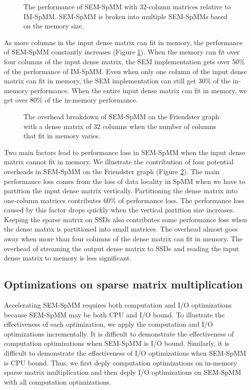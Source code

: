 \begin{figure}
	\begin{center}
		\footnotesize
		
		\caption{The performance of SEM-SpMM with 32-column matrices
			relative to IM-SpMM. SEM-SpMM is broken into multiple SEM-SpMMs
		based on the memory size.}
		\label{perf:spmm32}
	\end{center}
\end{figure}

As more columns in the input dense matrix can fit in memory, the performance
of SEM-SpMM constantly increases (Figure \ref{perf:spmm32}). When the memory
can fit over four columns of the input dense matrix, the SEM implementation
gets over 50\% of the performance of IM-SpMM. Even when only one column of
the input dense matrix
can fit in memory, the SEM implementation can still get 30\% of the in-memory
performance. When the entire input dense matrix can fit in memory, we get over
80\% of the in-memory performance.

\begin{figure}
	\begin{center}
		\footnotesize
		
		\caption{The overhead breakdown of SEM-SpMM on the Friendster
			graph with a dense matrix of 32 columns when the number
			of columns that fit in memory varies. }
		\label{perf:spmm32_over}
	\end{center}
\end{figure}

Two main factors lead to performance loss in SEM-SpMM when the input dense matrix
cannot fit in memory. We illustrate the contribution of four potential overheads
in SEM-SpMM on the Friendster graph (Figure \ref{perf:spmm32_over}). The main
performance loss comes from the loss of data locality in SpMM when we have to
partition the input dense matrix vertically.
Partitioning the dense matrix into one-column matrices contributes 60\%
of performance loss. The performance loss caused by this factor drops quickly
when the vertical partition size increases. Keeping the sparse matrix on SSDs
also contributes some performance loss when the dense matrix is partitioned
into small matrices. The overhead almost goes away when more than four columns
of the dense matrix can fit in memory. The overhead of streaming the output dense
matrix to SSDs and reading the input dense matrix to memory is less significant.

\subsection{Optimizations on sparse matrix multiplication}
Accelerating SEM-SpMM requires both computation and I/O optimizations because
SEM-SpMM may be both CPU and I/O bound. To illustrate the effectiveness of
each optimization, we apply the computation and I/O optimizations
incrementally. It is difficult to demonstrate the effectiveness of computation
optimizations when SEM-SpMM is I/O bound. Similarly, it is difficult to demonstrate
the effectiveness of I/O optimizations when SEM-SpMM is CPU bound. Thus, we first
deply computation optimizations on in-memory sparse matrix multiplication and then
deply I/O optimizations on SEM-SpMM with all computation optimizations.

